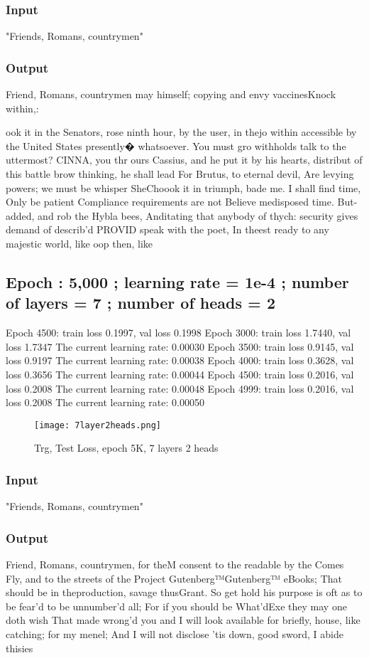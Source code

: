 \documentclass[conference]{IEEEtran}
\begin{document}
\subsubsection{Input}
"Friends, Romans, countrymen"
\subsubsection{Output}
Friend, Romans, countrymen may himself;
 copying and envy vaccinesKnock within,:

ook it in the Senators,
rose ninth hour, by the user, in thejo within accessible by the United States presently�
         whatsoever. You must gro withholds talk to the uttermost?
CINNA, you thr ours Cassius, and he put it by his hearts,
distribut of this battle brow thinking, he shall lead
For Brutus, to eternal devil,
Are levying powers; we must be whisper
SheChoook it in triumph,
 bade me.
I shall find time,
Only be patient Compliance requirements are not Believe medisposed time.
But-added, and rob the Hybla bees,
Anditating that anybody of thych: security gives demand of describ’d
PROVID speak with the poet,
In theest ready to any majestic world, like
oop then, like

\subsection{Epoch : 5,000 ; learning rate = 1e-4 ; number of layers = 7 ; number of heads = 2}
Epoch 4500: train loss 0.1997, val loss 0.1998
Epoch 3000: train loss 1.7440, val loss 1.7347
The current learning rate: 0.00030
Epoch 3500: train loss 0.9145, val loss 0.9197
The current learning rate: 0.00038
Epoch 4000: train loss 0.3628, val loss 0.3656
The current learning rate: 0.00044
Epoch 4500: train loss 0.2016, val loss 0.2008
The current learning rate: 0.00048
Epoch 4999: train loss 0.2016, val loss 0.2008
The current learning rate: 0.00050
\begin{figure}[H]
    \centering
    \texttt{[image: 7layer2heads.png]}
    \caption{Trg, Test Loss, epoch 5K, 7 layers 2 heads}
    \label{fig:epoch}
\end{figure}
\subsubsection{Input}
"Friends, Romans, countrymen"
\subsubsection{Output}
Friend, Romans, countrymen, for theM consent to the readable by the Comes
Fly, and to the streets of the Project Gutenberg™Gutenberg™ eBooks;
That should be in theproduction, savage thusGrant.
So get hold his purpose is oft as to be fear’d to be unnumber’d all;
For if you should be What’dExe
 they may one doth wish
That made wrong’d you and I will look available for briefly,
house, like catching; for my menel;
And I will not disclose ’tis down, good sword,
I abide thisies
\end{document}
